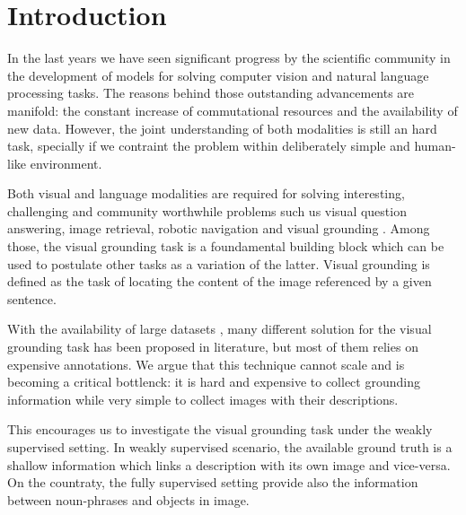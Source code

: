 \chapter{Introduction}
\label{introduction}

In the last years we have seen significant progress by the scientific
community in the development of models for solving computer vision and
natural language processing tasks. The reasons behind those
outstanding advancements are manifold: the constant increase of
commutational resources and the availability of new data. However, the
joint understanding of both modalities is still an hard task,
specially if we contraint the problem within deliberately simple and
human-like environment.

Both visual and language modalities are required for solving
interesting, challenging and community worthwhile problems such us
visual question answering, image retrieval, robotic navigation and
visual grounding . Among those, the visual grounding
task is a foundamental building block which can be used to postulate
other tasks as a variation of the latter. Visual grounding is defined
as the task of locating the content of the image referenced by a given
sentence.

With the availability of large datasets ,
many different solution for the visual grounding task has been
proposed in literature, but most of them relies on expensive
annotations. We argue that this technique cannot scale and is becoming
a critical bottlenck: it is hard and expensive to collect grounding
information while very simple to collect images with their
descriptions.

This encourages us to investigate the visual grounding task under the
weakly supervised setting. In weakly supervised scenario, the
available ground truth is a shallow information which links a
description with its own image and vice-versa. On the countraty, the
fully supervised setting provide also the information between
noun-phrases and objects in image.
